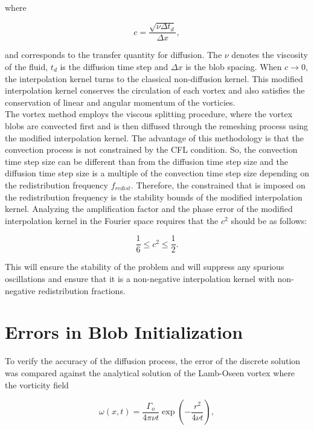 where 

\begin{equation}
c = \frac{\sqrt{\nu \Delta t_d}}{\Delta x},
\label{eq:c2}
\end{equation}

and corresponds to the transfer quantity for diffusion. The $\nu$ denotes the viscosity of the fluid, $t_d$ is the diffusion time step and $\Delta x$ is the blob spacing. When $c \rightarrow 0$, the interpolation kernel turns to the classical non-diffusion kernel.  This modified interpolation kernel conserves the circulation of each vortex and also satisfies the conservation of linear and angular momentum of the vorticies.\\

The vortex method employs the viscous splitting procedure, where the vortex blobs are convected first and is then diffused through the remeshing process using the modified interpolation kernel. The advantage of this methodology is that the convection process is not constrained by the CFL condition. So, the convection time step size can be different than from the diffusion time step size and the diffusion time step size is a multiple of the convection time step size depending on the redistribution frequency $f_{redist}$. Therefore, the constrained that is imposed on the redistribution frequency is the stability bounds of the modified interpolation kernel. Analyzing the amplification factor and the phase error of the modified interpolation kernel in the Fourier space requires that the $c^2$ should be as follows:


\begin{equation}
\frac{1}{6} \le c^2 \le \frac{1}{2}.
\label{eq:c2stability}
\end{equation}

This will ensure the stability of the problem and will suppress any spurious oscillations and ensure that it is a non-negative interpolation kernel with non-negative redistribution fractions.

\section{Errors in Blob Initialization}
To verify the accuracy of the diffusion process, the error of the discrete solution was compared against the analytical solution of the Lamb-Oseen vortex where the vorticity field

\begin{equation}
\omega\left(x,t\right) = \frac{\Gamma_o}{4\pi \nu t} \exp \left(-\frac{r^2}{4 \nu t} \right),
\label{eq:LambOseen}
\end{equation}

